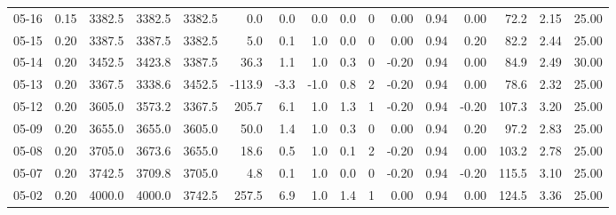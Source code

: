 \begin{threeparttable}
{\begin{tabular}{lrrrrrrrrrrrrrrr}
  05-16 &     0.15 & 3382.5 & 3382.5 & 3382.5 &        0.0 &            0.0 &                      0.0 &                 0.0 &              0 &       0.00 &      0.94 &           0.00 &             72.2 &            2.15 &                  25.00 \\
  05-15 &     0.20 & 3387.5 & 3387.5 & 3382.5 &        5.0 &            0.1 &                      1.0 &                 0.0 &              0 &       0.00 &      0.94 &           0.20 &             82.2 &            2.44 &                  25.00 \\
  05-14 &     0.20 & 3452.5 & 3423.8 & 3387.5 &       36.3 &            1.1 &                      1.0 &                 0.3 &              0 &      -0.20 &      0.94 &           0.00 &             84.9 &            2.49 &                  30.00 \\
  05-13 &     0.20 & 3367.5 & 3338.6 & 3452.5 &     -113.9 &           -3.3 &                     -1.0 &                 0.8 &              2 &      -0.20 &      0.94 &           0.00 &             78.6 &            2.32 &                  25.00 \\
  05-12 &     0.20 & 3605.0 & 3573.2 & 3367.5 &      205.7 &            6.1 &                      1.0 &                 1.3 &              1 &      -0.20 &      0.94 &          -0.20 &            107.3 &            3.20 &                  25.00 \\
  05-09 &     0.20 & 3655.0 & 3655.0 & 3605.0 &       50.0 &            1.4 &                      1.0 &                 0.3 &              0 &       0.00 &      0.94 &           0.20 &             97.2 &            2.83 &                  25.00 \\
  05-08 &     0.20 & 3705.0 & 3673.6 & 3655.0 &       18.6 &            0.5 &                      1.0 &                 0.1 &              2 &      -0.20 &      0.94 &           0.00 &            103.2 &            2.78 &                  25.00 \\
  05-07 &     0.20 & 3742.5 & 3709.8 & 3705.0 &        4.8 &            0.1 &                      1.0 &                 0.0 &              0 &      -0.20 &      0.94 &          -0.20 &            115.5 &            3.10 &                  25.00 \\
  05-02 &     0.20 & 4000.0 & 4000.0 & 3742.5 &      257.5 &            6.9 &                      1.0 &                 1.4 &              1 &       0.00 &      0.94 &           0.00 &            124.5 &            3.36 &                  25.00 \\

\end{tabular}}
\end{threeparttable}
